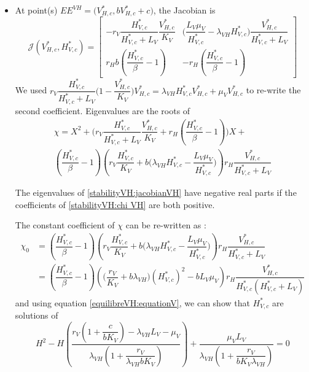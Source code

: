 \documentclass{article}
\newcommand{\lv}{\lambda_{VH}}
\begin{document}
\begin{itemize}
\item At point(s) $EE^{VH} = \Big(V^*_{H, c}, b V^*_{H, c} + c)$, the Jacobian is
\begin{equation}
\mathcal{J}(V^*_{H, c}, H^*_{V, c}) = \begin{bmatrix}
-r_V\dfrac{H^*_{V, c}}{H^*_{V, c} + L_V} \dfrac{V^*_{H, c}}{K_V} & \Big(\dfrac{L_V\mu_V}{H^*_{V, c}} - \lv H^*_{V, c}) \dfrac{V^*_{H, c}}{H^*_{V, c} + L_V} \\
r_H b (\dfrac{H^*_{V, c}}{\beta} - 1) & -r_H(\dfrac{H^*_{V, c}}{\beta} - 1)
\end{bmatrix}
\label{stabilityVH:jacobianVH}
\end{equation}
We used $r_V \dfrac{H^*_{V, c}}{H^*_{V, c} + L_V} \Big(1 - \dfrac{V^*_{H, c}}{K_V} \Big)V^*_{H, c} = \lv H^*_{V, c} V^*_{H, c} + \mu_VV^*_{H, c}$ to re-write the second coefficient.
Eigenvalues are the roots of 
\begin{multline}
\chi = X^2 + \Big(r_V  \dfrac{H^*_{V, c}}{H^*_{V, c}+L_V}\dfrac{V^*_{H, c}}{K_V} + r_H(\dfrac{H^*_{V, c}}{\beta} - 1)\Big)X + \\
 (\dfrac{H^*_{V, c}}{\beta} - 1) \left(r_V  \dfrac{H^*_{V, c}}{K_V}  + b \Big(\lv H^*_{V, c} - \dfrac{L_V \mu_V}{H^*_{V, c}} \Big) \right) r_H\dfrac{V^*_{H, c}}{H^*_{V, c} + L_V}
 \label{stabilityVH:chi VH}
\end{multline}

The eigenvalues of \eqref{stabilityVH:jacobianVH} have negative real parts if the coefficients of \eqref{stabilityVH:chi VH} are both positive.

The constant coefficient of $\chi$ can be re-written as :
\begin{subequations}
\begin{align}
\chi_0 &= (\dfrac{H^*_{V, c}}{\beta} - 1) \left(r_V  \dfrac{H^*_{V, c}}{K_V}  + b \Big(\lv H^*_{V, c} - \dfrac{L_V \mu_V}{H^*_{V, c}} \Big) \right) r_H\dfrac{V^*_{H, c}}{H^*_{V, c} + L_V} \\
&= (\dfrac{H^*_{V, c}}{\beta} - 1) \left( \Big(\dfrac{r_V}{K_V} + b\lv\Big) (H^*_{V, c})^2 - b L_V \mu_V \right) r_H\dfrac{V^*_{H, c}}{H^*_{V, c}(H^*_{V, c} + L_V)}
\end{align}
\end{subequations}
and using equation \eqref{equilibreVH:equationV}, we can show that $H^*_{V, c}$ are solutions of
\begin{equation}
H^2 - H \left( \dfrac{r_V(1 + \dfrac{c}{bK_V}) - \lv L_V - \mu_V}{\lv(1 + \dfrac{r_V}{\lv bK_V})} \right) + \dfrac{\mu_V L_V}{\lv(1 + \dfrac{r_V}{bK_V\lv})} = 0
\label{equilibreVH:equation H}
\end{equation}


\end{itemize}
\end{document}
